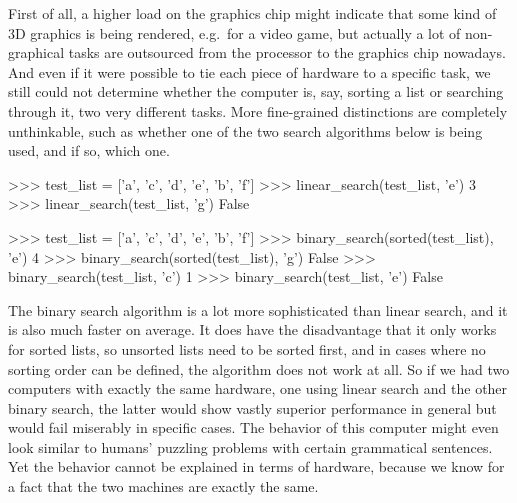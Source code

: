 First of all, a higher load on the graphics chip might indicate that some kind of 3D graphics is being rendered, e.g.\ for a video game, but actually a lot of non-graphical tasks are outsourced from the processor to the graphics chip nowadays.
And even if it were possible to tie each piece of hardware to a specific task,
we still could not determine whether the computer is, say, sorting a list or searching through it, two very different tasks.
More fine-grained distinctions are completely unthinkable, such as whether one of the two search algorithms below is being used, and if so, which one.
%
\begin{center}
\end{center}
\begin{center}
    \begin{pythoncode}
        >>> test_list = ['a', 'c', 'd', 'e', 'b', 'f']
        >>> linear_search(test_list, 'e')
        3
        >>> linear_search(test_list, 'g')
        False
    \end{pythoncode}
\end{center}

\begin{center}
\end{center}
\begin{center}
    \begin{pythoncode}
        >>> test_list = ['a', 'c', 'd', 'e', 'b', 'f']
        >>> binary_search(sorted(test_list), 'e')
        4
        >>> binary_search(sorted(test_list), 'g')
        False
        >>> binary_search(test_list, 'c')
        1
        >>> binary_search(test_list, 'e')
        False
    \end{pythoncode}
\end{center}
%
The binary search algorithm is a lot more sophisticated than linear search, and it is also much faster on average.
It does have the disadvantage that it only works for sorted lists, so unsorted lists need to be sorted first, and in cases where no sorting order can be defined, the algorithm does not work at all.
So if we had two computers with exactly the same hardware, one using linear search and the other binary search, the latter would show vastly superior performance in general but would fail miserably in specific cases.
The behavior of this computer might even look similar to humans' puzzling problems with certain grammatical sentences.
Yet the behavior cannot be explained in terms of hardware, because we know for a fact that the two machines are exactly the same.

